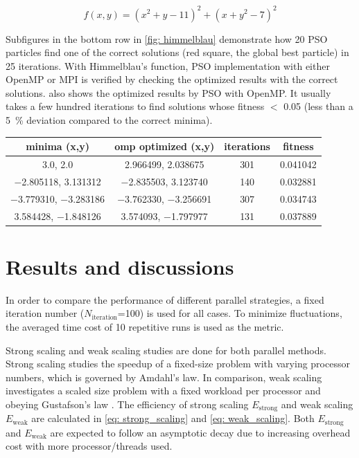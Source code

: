 \documentclass[conference, 10pt]{IEEEtran}
\newcommand{\N}[1]{\ensuremath{N_\text{#1}}}
\newcommand{\Niter}{\N{iteration}}
\begin{document}
\begin{equation}
f(x,y) = (x^2 + y -11)^2 + (x + y^2 - 7)^2
\label{eq: himmelblau}
\end{equation} 

Subfigures in the bottom row in \cref{fig: himmelblau} demonstrate how 20 PSO particles find one of the correct solutions (red square, the global best particle) in 25 iterations. 
With Himmelblau's function, PSO implementation with either OpenMP or MPI is verified by checking the optimized results with the correct solutions. 
 also shows the optimized results by PSO with OpenMP.
It usually takes a few hundred iterations to find solutions whose fitness $<$ 0.05  (less than a \SI{5}{\percent} deviation compared to the correct minima).

\begin{table}[h!]
\label{tab: local_minima}
\begin{center}
\begin{tabular}{ cccc } 
\toprule
minima (x,y) & omp optimized (x,y) & iterations & fitness \\
 \midrule
 \num{3.0}, \num{2.0} &\num{2.966499}, \num{2.038675} & 301& \num{0.041042}\\
 \num{-2.805118}, \num{3.131312}  &\num{-2.835503}, \num{3.123740 }& 140& \num{0.032881}\\
 \num{-3.779310}, \num{-3.283186} &\num{-3.762330}, \num{-3.256691}  & 307&\num{0.034743}\\
 \num{3.584428}, \num{-1.848126} &\num{3.574093}, \num{-1.797977} &  131& \num{0.037889} \\
 \bottomrule
\end{tabular}
\end{center}
\end{table}


\section{Results and discussions}
In order to compare the performance of different parallel strategies, a fixed iteration number (\Niter=100) is used for all cases.
To minimize fluctuations, the averaged time cost of 10 repetitive runs is used as the metric.

Strong scaling and weak scaling studies are done for both parallel methods.
Strong scaling studies the speedup of a fixed-size problem with varying processor numbers, which is governed by Amdahl's law.
In comparison, weak scaling investigates a scaled size problem with a fixed workload per processor and obeying Gustafson's law \cite{eijkhout_2016, eijkhout_2016_2}.
The efficiency of strong scaling $E_\text{strong}$ and weak scaling $E_\text{weak}$ are calculated in \cref{eq: strong_scaling} and \cref{eq: weak_scaling}.
Both $E_\text{strong}$ and $E_\text{weak}$ are expected to follow an asymptotic decay due to increasing overhead cost with more processor/threads used.
\end{document}
